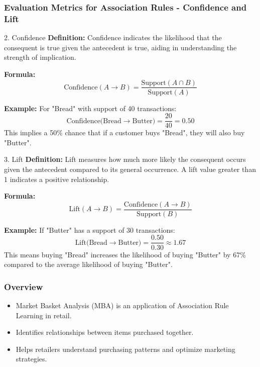 \documentclass[aspectratio=169]{beamer}
\begin{document}
\begin{frame}[fragile]
    \frametitle{Evaluation Metrics for Association Rules - Confidence and Lift}
    
    \begin{block}{2. Confidence}
        \textbf{Definition:} Confidence indicates the likelihood that the consequent is true given the antecedent is true, aiding in understanding the strength of implication.
        
        \textbf{Formula:}
        \begin{equation}
            \text{Confidence}(A \rightarrow B) = \frac{\text{Support}(A \cap B)}{\text{Support}(A)}
        \end{equation}
        
        \textbf{Example:} For "Bread" with support of 40 transactions:
        \begin{equation}
            \text{Confidence(Bread} \rightarrow \text{Butter)} = \frac{20}{40} = 0.50
        \end{equation}
        This implies a 50\% chance that if a customer buys "Bread", they will also buy "Butter".
    \end{block}
    
    \begin{block}{3. Lift}
        \textbf{Definition:} Lift measures how much more likely the consequent occurs given the antecedent compared to its general occurrence. A lift value greater than 1 indicates a positive relationship.

        \textbf{Formula:}
        \begin{equation}
            \text{Lift}(A \rightarrow B) = \frac{\text{Confidence}(A \rightarrow B)}{\text{Support}(B)}
        \end{equation}
        
        \textbf{Example:} If "Butter" has a support of 30 transactions:
        \begin{equation}
            \text{Lift(Bread} \rightarrow \text{Butter)} = \frac{0.50}{0.30} \approx 1.67
        \end{equation}
        This means buying "Bread" increases the likelihood of buying "Butter" by 67\% compared to the average likelihood of buying "Butter".
    \end{block}
\end{frame}

\begin{frame}[fragile]
    \frametitle{Overview}
    \begin{itemize}
        \item Market Basket Analysis (MBA) is an application of Association Rule Learning in retail.
        \item Identifies relationships between items purchased together.
        \item Helps retailers understand purchasing patterns and optimize marketing strategies.
    \end{itemize}
\end{frame}
\end{document}
